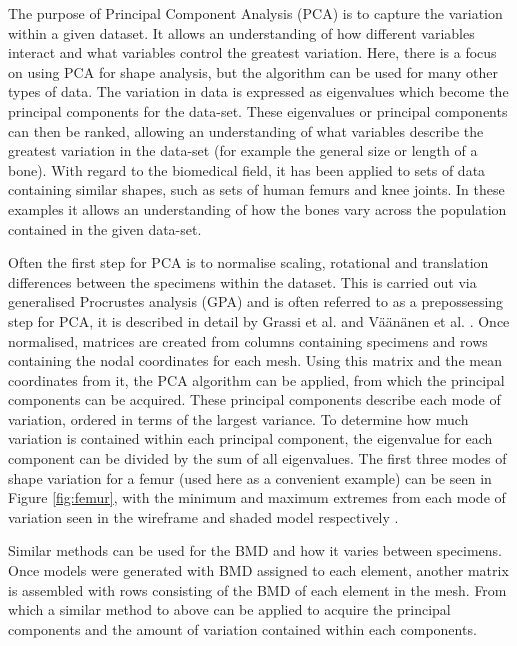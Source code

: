 The purpose of Principal Component Analysis (PCA) is to capture the variation within a given dataset.
It allows an understanding of how different variables interact and what variables control the greatest variation.
Here, there is a focus on using PCA for shape analysis, but the algorithm can be used for many other types of data.
The variation in data is expressed as eigenvalues which become the principal components for the data-set.
These eigenvalues or principal components can then be ranked, allowing an understanding of what variables describe the greatest variation in the data-set (for example the general size or length of a bone).
With regard to the biomedical field, it has been applied to sets of data containing similar shapes, such as sets of human femurs and knee joints.
In these examples it allows an understanding of how the bones vary across the population contained in the given data-set.


Often the first step for PCA is to normalise scaling, rotational and
translation differences between the specimens within the dataset. This
is carried out via generalised Procrustes analysis (GPA) and is often
referred to as a prepossessing step for PCA, it is described in detail
by Grassi et al. \cite{Grassi2014} and V{\"a}{\"a}n{\"a}nen et al. \cite{Vaananen2015}.
Once normalised, matrices are created from columns containing specimens and rows
containing the nodal coordinates for each mesh. Using this matrix and
the mean coordinates from it, the PCA algorithm can be applied, from
which the principal components can be acquired. These principal
components describe each mode of variation, ordered in terms of the
largest variance. To determine how much variation is contained within
each principal component, the eigenvalue for each component can be
divided by the sum of all eigenvalues. The first three modes of shape
variation for a femur (used here as a convenient example) can be seen in Figure \ref{fig:femur}, with the
minimum and
maximum extremes from each mode of variation seen in the wireframe and
shaded model respectively \cite{Grassi2014}.

Similar methods can be used for the BMD and how it varies between
specimens. Once models were generated with BMD assigned to each element,
another matrix is assembled with rows consisting of the BMD of each
element in the mesh. From which a similar method to above can be applied
to acquire the principal components and the amount of variation
contained within each components.

